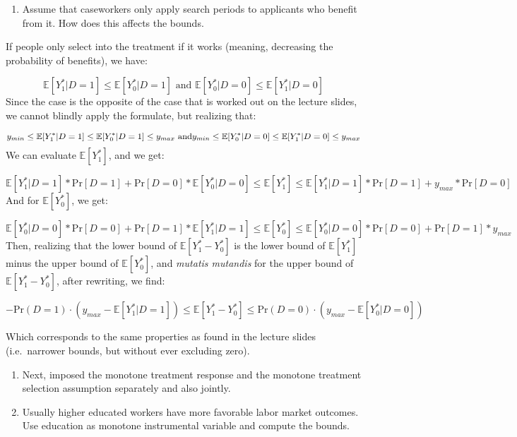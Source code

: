 \documentclass[
]{article}
\providecommand{\tightlist}{%
  \setlength{\itemsep}{0pt}\setlength{\parskip}{0pt}}
\begin{document}
\begin{enumerate}
\def\labelenumi{\arabic{enumi}.}
\setcounter{enumi}{4}
\tightlist
\item
  Assume that caseworkers only apply search periods to applicants who
  benefit from it. How does this affects the bounds.
\end{enumerate}

If people only select into the treatment if it works (meaning,
decreasing the probability of benefits), we have:

\[
\mathbb{E}[Y^*_1 | D=1] \leq \mathbb{E}[Y^*_0 | D = 1] \text{ and } \mathbb{E}[Y^*_0 | D = 0] \leq \mathbb{E}[Y^*_1 | D = 0]
\] Since the case is the opposite of the case that is worked out on the
lecture slides, we cannot blindly apply the formulate, but realizing
that:

\[
y_{min} \leq \mathbb{E}[Y^*_1 | D=1] \leq \mathbb{E}[Y^*_0 | D = 1] \leq y_{max} \text{ and} \\
y_{min} \leq \mathbb{E}[Y^*_0 | D = 0] \leq \mathbb{E}[Y^*_1 | D = 0] \leq y_{max}
\] We can evaluate \(\mathbb{E}[Y^*_1]\), and we get:

\[
\mathbb{E}[Y^*_1 | D = 1] * \text{Pr}[D=1] + \text{Pr}[D=0] * \mathbb{E}[Y^*_0 | D=0] \leq \mathbb{E}[Y^*_1] \leq \mathbb{E}[Y^*_1 | D = 1] * \text{Pr}[D=1] + y_{max} * \text{Pr}[D=0]
\] And for \(\mathbb{E}[Y^*_0]\), we get:

\[
\mathbb{E}[Y^*_0 | D = 0] * \text{Pr}[D=0] + \text{Pr}[D=1] * \mathbb{E}[Y^*_1 | D = 1] \leq \mathbb{E}[Y^*_0] \leq \mathbb{E}[Y^*_0 | D = 0] * \text{Pr}[D=0] + \text{Pr}[D=1]*y_{max}
\] Then, realizing that the lower bound of \(\mathbb{E}[Y^*_1 - Y^*_0]\)
is the lower bound of \(\mathbb{E}[Y^*_1]\) minus the upper bound of
\(\mathbb{E}[Y^*_0]\), and \emph{mutatis mutandis} for the upper bound
of \(\mathbb{E}[Y^*_1 - Y^*_0]\), after rewriting, we find:

\[
-\text{Pr}(D=1) \cdot \left( y_{max} - \mathbb{E}[Y^*_1 | D = 1] \right) \leq \mathbb{E}[Y^*_1 - Y^*_0] \leq \text{Pr}(D=0) \cdot \left( y_{max} - \mathbb{E}[Y^*_0 | D = 0] \right)
\]

Which corresponds to the same properties as found in the lecture slides
(i.e.~narrower bounds, but without ever excluding zero).

\begin{enumerate}
\def\labelenumi{\arabic{enumi}.}
\setcounter{enumi}{5}
\item
  Next, imposed the monotone treatment response and the monotone
  treatment selection assumption separately and also jointly.
\item
  Usually higher educated workers have more favorable labor market
  outcomes. Use education as monotone instrumental variable and compute
  the bounds.
\end{enumerate}
\end{document}
